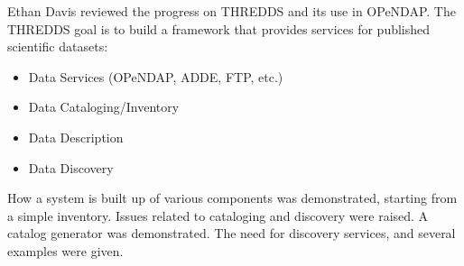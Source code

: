 Ethan Davis reviewed the progress on \ac{THREDDS} and its use in
\ac{OPeNDAP}.  The \ac{THREDDS} goal is to build a framework
that provides services for published scientific datasets:

\begin{itemize}
   \item Data Services (\ac{OPeNDAP}, ADDE, \ac{FTP}, etc.)
   \item Data Cataloging/Inventory
   \item Data Description
   \item Data Discovery
\end{itemize}

How a system is built up of various components was demonstrated,
starting from a simple inventory.  Issues related to cataloging
and discovery were raised.  A catalog generator was demonstrated.
The need for discovery services, and several examples were given.

%
%
%
%

